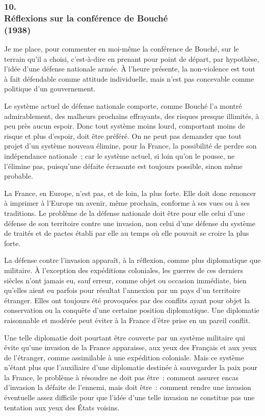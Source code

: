 \documentclass[french,twoside]{book} %
\begin{document}
\subsubsection[{10. Réflexions sur la conférence de Bouché, (1938)}]{10. \\
Réflexions sur la conférence de Bouché \\
(1938)}
\noindent \par
Je me place, pour commenter en moi-même la conférence de Bouché, sur le terrain qu'il a choisi, c'est-à-dire en prenant pour point de départ, par hypothèse, l'idée d'une défense nationale armée. À l'heure présente, la non-violence est tout à fait défendable comme attitude individuelle, mais n'est pas concevable comme politique d'un gouvernement.\par
Le système actuel de défense nationale comporte, comme Bouché l'a montré admirablement, des malheurs prochains effrayants, des risques presque illimités, à peu près aucun espoir. Donc tout système moins lourd, comportant moins de risque et plus d'espoir, doit être préféré. On ne peut pas demander que tout projet d'un système nouveau élimine, pour la France, la possibilité de perdre son indépendance nationale ; car le système actuel, si loin qu'on le pousse, ne l'élimine pas, puisqu'une défaite écrasante est toujours possible, sinon même probable.\par
La France, en Europe, n'est pas, et de loin, la plus forte. Elle doit donc renoncer à imprimer à l'Europe un avenir, même prochain, conforme à ses vues ou à ses traditions. Le problème de la défense nationale doit être pour elle celui d'une défense de son territoire contre une invasion, non celui d'une défense du système de traités et de pactes établi par elle au temps où elle pouvait se croire la plus forte.\par
La défense contre l'invasion apparaît, à la réflexion, comme plus diploma­tique que militaire. À l'exception des expéditions coloniales, les guerres de ces derniers siècles n'ont jamais eu, sauf erreur, comme objet ou occasion immédiate, bien qu'elles aient eu parfois pour résultat l'annexion par un pays d'un territoire étranger. Elles ont toujours été provoquées par des conflits ayant pour objet la conservation ou la conquête d'une certaine position diplo­matique. Une diplomatie raisonnable et modérée peut éviter à la France d'être prise en un pareil conflit.\par
Une telle diplomatie doit pourtant être couverte par un système militaire qui évite qu'une invasion de la France apparaisse, aux yeux des Français et aux yeux de l'étranger, comme assimilable à une expédition coloniale. Mais ce système n'étant plus que l'auxiliaire d'une diplomatie destinée à sauvegarder la paix pour la France, le problème à résoudre ne doit pas être : comment assurer encas d'invasion la défaite de l'ennemi, mais doit être : comment rendre une invasion éventuelle assez difficile pour que l'idée d'une telle invasion ne constitue pas une tentation aux yeux des États voisins.\par
\end{document}
